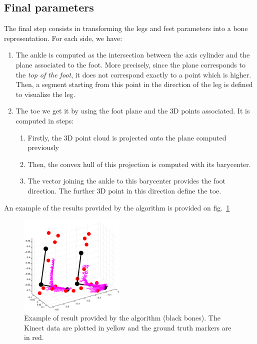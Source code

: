 \documentclass[letterpaper, 10 pt, conference]{ieeeconf}
\begin{document}
\subsection{Final parameters}
The final step consists in transforming the legs and feet parameters into a bone representation. For each side, we have:
\begin{enumerate}
	\item The ankle is computed as the intersection between the axis cylinder and the plane associated to the foot. More precisely, since the plane corresponds to the \emph{top of the foot}, it does not correspond exactly to a point which is higher. Then, a segment starting from this point in the direction of the leg is defined to visualize the leg.
	\item The toe we get it by using the foot plane and the 3D points associated. It is computed in steps:
	\begin{enumerate}
		\item Firstly, the 3D point cloud is projected onto the plane computed previously
		\item Then, the convex hull of this projection is computed with its barycenter.
		\item The vector joining the ankle to this barycenter provides the foot direction. The further 3D point in this direction define the toe.
	\end{enumerate}
\end{enumerate}
An example of the results provided by the algorithm is provided on fig.~\ref{fig:exampleBones}

\begin{figure}
	\centering
	\includegraphics[width=0.45\textwidth,trim=0cm 2cm 0cm 1cm,clip=true]{images/exampleBones}
	\caption{Example of result provided by the algorithm (black bones). The Kinect data are plotted in yellow and the ground truth markers are in red.}
	\label{fig:exampleBones}
\end{figure}
\end{document}

